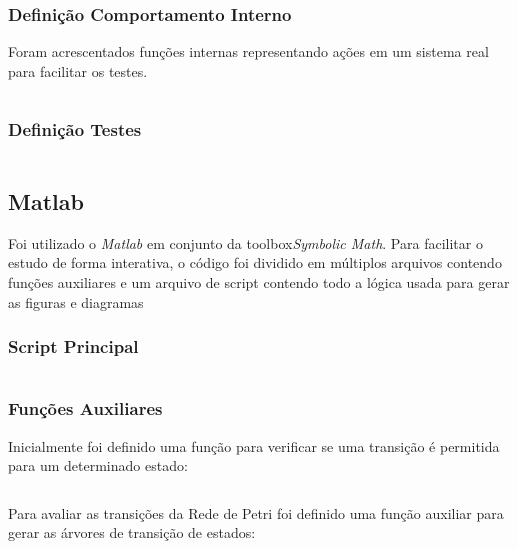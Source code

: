 \documentclass[a4paper,11pt]{article}
\begin{document}
\newpage
\subsubsection*{Definição Comportamento Interno}
Foram acrescentados funções internas representando ações em um sistema real para facilitar os testes.
\inputminted[xleftmargin=15pt,linenos,frame=single,framesep=5pt,breaklines=true]{c}{../c/state_machine/src/state_machine.c}

\newpage
\subsubsection*{Definição Testes}
\inputminted[xleftmargin=15pt,linenos,frame=single,framesep=5pt,breaklines=true]{c}{../c/state_machine/src/test_1.c}

\newpage
\subsection*{Matlab}

Foi utilizado o \textit{Matlab} em conjunto da toolbox\textit{Symbolic Math}\cite{matlabsymbolic}. Para facilitar o estudo de forma interativa, o código foi dividido em múltiplos arquivos contendo funções auxiliares e um arquivo de script contendo todo a lógica usada para gerar as figuras e diagramas

\subsubsection*{Script Principal}

\inputminted[xleftmargin=15pt,linenos,frame=single,framesep=5pt,breaklines=true]{matlab}{../matlab/petrinetproject.m}

\subsubsection*{Funções Auxiliares}

Inicialmente foi definido uma função para verificar se uma transição é permitida para um determinado estado:

\inputminted[xleftmargin=15pt,linenos,frame=single,framesep=5pt,breaklines=true]{matlab}{../matlab/petristate.m}

Para avaliar as transições da Rede de Petri foi definido uma função auxiliar para gerar as árvores de transição de estados:

\inputminted[xleftmargin=15pt,linenos,frame=single,framesep=5pt,breaklines=true]{matlab}{../matlab/dotpetree.m}

\end{document}
